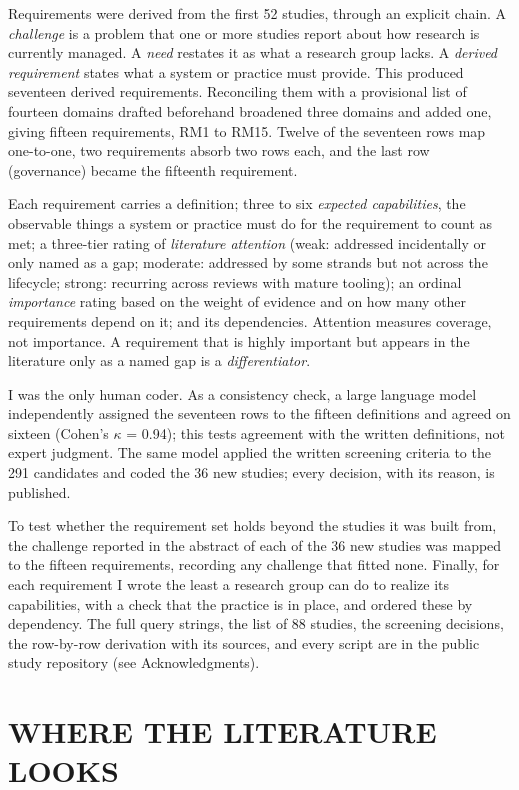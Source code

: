 \documentclass{IEEEcsmag}
\begin{document}
Requirements were derived from the first 52 studies, through an explicit chain. A \emph{challenge} is a problem that one or more studies report about how research is currently managed. A \emph{need} restates it as what a research group lacks. A \emph{derived requirement} states what a system or practice must provide. This produced seventeen derived requirements. Reconciling them with a provisional list of fourteen domains drafted beforehand broadened three domains and added one, giving fifteen requirements, RM1 to RM15. Twelve of the seventeen rows map one-to-one, two requirements absorb two rows each, and the last row (governance) became the fifteenth requirement.

Each requirement carries a definition; three to six \emph{expected capabilities}, the observable things a system or practice must do for the requirement to count as met; a three-tier rating of \emph{literature attention} (weak: addressed incidentally or only named as a gap; moderate: addressed by some strands but not across the lifecycle; strong: recurring across reviews with mature tooling); an ordinal \emph{importance} rating based on the weight of evidence and on how many other requirements depend on it; and its dependencies. Attention measures coverage, not importance. A requirement that is highly important but appears in the literature only as a named gap is a \emph{differentiator}.

I was the only human coder. As a consistency check, a large language model independently assigned the seventeen rows to the fifteen definitions and agreed on sixteen (Cohen's $\kappa$ = 0.94); this tests agreement with the written definitions, not expert judgment. The same model applied the written screening criteria to the 291 candidates and coded the 36 new studies; every decision, with its reason, is published.

To test whether the requirement set holds beyond the studies it was built from, the challenge reported in the abstract of each of the 36 new studies was mapped to the fifteen requirements, recording any challenge that fitted none. Finally, for each requirement I wrote the least a research group can do to realize its capabilities, with a check that the practice is in place, and ordered these by dependency. The full query strings, the list of 88 studies, the screening decisions, the row-by-row derivation with its sources, and every script are in the public study repository (see Acknowledgments).

\section{WHERE THE LITERATURE LOOKS}
\end{document}
